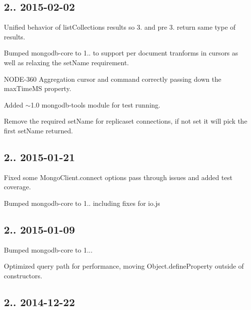 \subsection*{2.. 2015-\/02-\/02 }


\begin{DoxyItemize}
\item Unified behavior of list\+Collections results so 3. and pre 3. return same type of results.
\item Bumped mongodb-\/core to 1.. to support per document tranforms in cursors as well as relaxing the set\+Name requirement.
\item N\+O\+D\+E-\/360 Aggregation cursor and command correctly passing down the max\+Time\+MS property.
\item Added $\sim$1.0 mongodb-\/tools module for test running.
\item Remove the required set\+Name for replicaset connections, if not set it will pick the first set\+Name returned.
\end{DoxyItemize}

\subsection*{2.. 2015-\/01-\/21 }


\begin{DoxyItemize}
\item Fixed some Mongo\+Client.\+connect options pass through issues and added test coverage.
\item Bumped mongodb-\/core to 1.. including fixes for io.\+js
\end{DoxyItemize}

\subsection*{2.. 2015-\/01-\/09 }


\begin{DoxyItemize}
\item Bumped mongodb-\/core to 1...
\item Optimized query path for performance, moving Object.\+define\+Property outside of constructors.
\end{DoxyItemize}

\subsection*{2.. 2014-\/12-\/22 }


